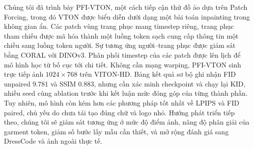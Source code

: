 \documentclass[11pt,a4paper]{article}
\begin{document}
Chúng tôi đã trình bày PFI-VTON, một cách tiếp cận thử đồ ảo dựa trên Patch Forcing, trong đó VTON được biểu diễn dưới dạng một bài toán inpainting trong không gian ẩn. Các patch vùng trang phục mang timestep riêng, trang phục tham chiếu được mã hóa thành một luồng token sạch cung cấp thông tin một chiều sang luồng token người. Sự tương ứng người--trang phục được giám sát bằng CORAL với DINOv3. Phân phối timestep của các patch được lên lịch để mô hình học từ bố cục tới chi tiết. Không cần mạng warping, PFI-VTON sinh trực tiếp ảnh \(1024\times768\) trên VITON-HD. Bảng kết quả sơ bộ ghi nhận FID unpaired 9.781 và SSIM 0.883, nhưng cần xác minh checkpoint và chạy lại KID, nhiều seed cùng ablation trước khi kết luận mức đóng góp của từng thành phần. Tuy nhiên, mô hình còn kém hơn các phương pháp tốt nhất về LPIPS và FID paired, chủ yếu do chưa tái tạo đúng chữ và logo nhỏ. Hướng phát triển tiếp theo, chúng tôi sẽ giám sát tương ứng ở mức độ điểm ảnh, nâng độ phân giải của garment token, giảm số bước lấy mẫu cần thiết, và mở rộng đánh giá sang DressCode và ảnh ngoài thực tế.
\end{document}
